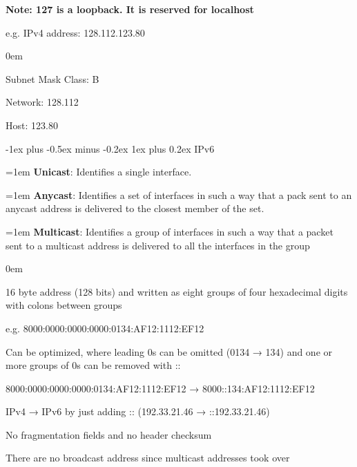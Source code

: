 \documentclass[letterpaper,8pt]{extarticle}
\makeatletter
\newcommand{\definition}[2]{
  \hangindent=1em
  \textbf{#1}: #2%
}
\renewcommand{\subsubsection}{\@startsection{subsubsection}{3}{0mm}%
  {-1ex plus -0.5ex minus -0.2ex}%
  {1ex plus 0.2ex}%
{\color{h3} \normalfont\fontsize{5.5}{5.5}\selectfont\bfseries\itshape}}
\let\olditemize\itemize \let\endolditemize\enditemize
\renewenvironment{itemize}{\olditemize \itemsep0em}{\endolditemize}
\makeatother
\begin{document}
\begin{multicols*}{5}
\begin{multicols}{2}
    \textbf{Note: 127 is a loopback. It is reserved for localhost}
    
    \columnbreak
    
    e.g. IPv4 address: 128.112.123.80
    
    \begin{itemize}
      \item Subnet Mask Class: B
      \item Network: 128.112
      \item Host: 123.80
    \end{itemize}
  \end{multicols}
  
  \vspace{0.2cm}
  
  \subsubsection{IPv6}
  
  \definition{Unicast}{Identifies a single interface.}
  
  \definition{Anycast}{Identifies a set of interfaces in such a way that a pack sent to an anycast address is delivered to the closest member of the set.}
  
  \definition{Multicast}{Identifies a group of interfaces in such a way that a packet sent to a multicast address is delivered to all the interfaces in the group}
  
  \begin{itemize}
    \item 16 byte address (128 bits) and written as eight groups of four hexadecimal digits with colons between groups
    \item e.g. 8000:0000:0000:0000:0134:AF12:1112:EF12
    \item Can be optimized, where leading 0s can be omitted (0134 → 134) and one or more groups of 0s can be removed with ::
    \item 8000:0000:0000:0000:0134:AF12:1112:EF12 → 8000::134:AF12:1112:EF12
    \item IPv4 → IPv6 by just adding :: (192.33.21.46 → ::192.33.21.46)
    \item No fragmentation fields and no header checksum
    \item There are no broadcast address since multicast addresses took over
  \end{itemize}
  

\end{multicols*}
\end{document}
